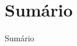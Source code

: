 \documentclass[9pt]{beamer}
\begin{document}
\begin{frame}
  \titlepage
\end{frame}

\section*{Sumário}

\begin{frame}{Sumário}
  \tableofcontents %
\end{frame}


%
%
%

%
%
%
%
%
%
%
%
%
%
%


\end{document}
